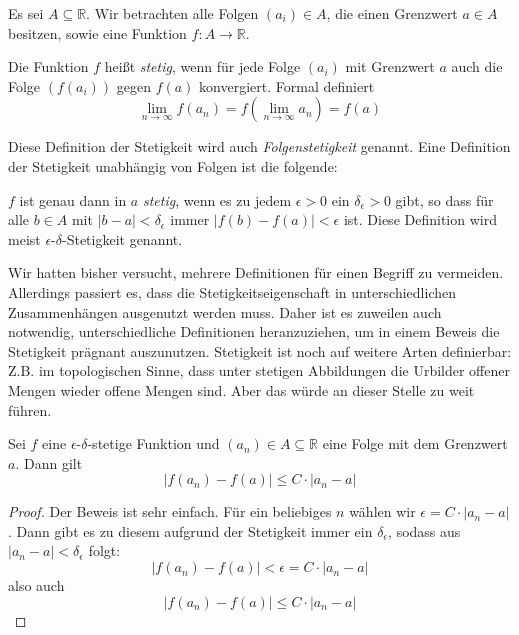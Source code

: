 Es sei $A\subseteq \mathbb{R}$. Wir betrachten alle Folgen $(a_i)\in A$, die einen Grenzwert $a\in A$ besitzen, sowie eine Funktion $f: A\longrightarrow \mathbb{R}$. 

\begin{definition}
Die Funktion $f$ heißt \emph{stetig}, wenn für jede Folge $(a_i)$ mit Grenzwert $a$ auch die Folge $(f(a_i))$ gegen $f(a)$ konvergiert. Formal definiert
\[
\lim_{n\rightarrow \infty} f(a_n) = f(\lim_{n\rightarrow \infty} a_n) = f(a)
\]
\end{definition}

Diese Definition der Stetigkeit wird auch \emph{Folgenstetigkeit} genannt. Eine Definition der Stetigkeit unabhängig von Folgen ist die folgende: 

\begin{definition}
$f$ ist genau dann in $a$ \emph{stetig}, wenn es zu jedem $\epsilon>0$ ein $\delta_\epsilon > 0$ gibt, so dass für alle $b\in A$ mit $\vert b-a\vert < \delta_\epsilon $ immer $\vert f(b)-f(a)\vert < \epsilon$ ist. Diese Definition wird meist $\epsilon$-$\delta$-Stetigkeit genannt. 
\end{definition}

Wir hatten bisher versucht, mehrere Definitionen für einen Begriff zu vermeiden. Allerdings passiert es, dass die Stetigkeitseigenschaft in unterschiedlichen Zusammenhängen ausgenutzt werden muss. Daher ist es zuweilen auch notwendig, unterschiedliche Definitionen heranzuziehen, um in einem Beweis die Stetigkeit prägnant auszunutzen. Stetigkeit ist noch auf weitere Arten definierbar: Z.B. im topologischen Sinne, dass unter stetigen Abbildungen die Urbilder offener Mengen wieder offene Mengen sind. Aber das würde an dieser Stelle zu weit führen.

\begin{lemma}\label{lem:stetig}
Sei $f$ eine $\epsilon$-$\delta$-stetige Funktion und $(a_n)\in A \subseteq \mathbb{R}$ eine Folge mit dem Grenzwert $a$. Dann gilt
\[
|f(a_n)-f(a)| \le C\cdot |a_n -a|
\]
\end{lemma}
\begin{proof}
Der Beweis ist sehr einfach. Für ein beliebiges $n$ wählen wir $\epsilon = C\cdot |a_n -a|$. Dann gibt es zu diesem aufgrund der Stetigkeit immer ein $\delta_\epsilon$, sodass aus $|a_n-a|<\delta_\epsilon$ folgt:
\[
|f(a_n)-f(a)| < \epsilon = C\cdot |a_n -a|
\]
also auch
\[
|f(a_n)-f(a)| \le C\cdot |a_n -a|
\]
\end{proof}

